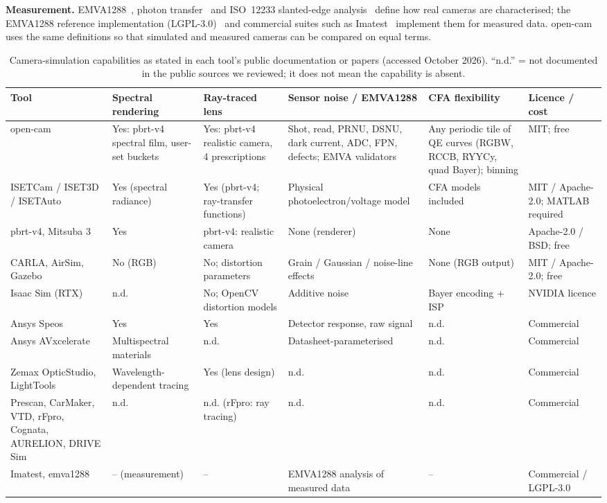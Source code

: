 \documentclass[letterpaper,twocolumn,fleqn]{article}
\begin{document}
\textbf{Measurement.} EMVA1288~\cite{emva1288std,borek2023emva}, photon transfer~\cite{janesick2007photon} and ISO~12233 slanted-edge analysis~\cite{iso12233,williams2003lowfreq} define how real cameras are characterised; the EMVA1288 reference implementation (LGPL-3.0)~\cite{emva1288py} and commercial suites such as Imatest~\cite{imatest} implement them for measured data. open-cam uses the same definitions so that simulated and measured cameras can be compared on equal terms.

\begin{table}[t]
\caption{Camera-simulation capabilities as stated in each tool's public documentation or papers (accessed October 2026). ``n.d.'' = not documented in the public sources we reviewed; it does not mean the capability is absent.}
\label{tab:compare}
\vspace{14pt}
\centering\small
\begin{tabular}{@{}p{2.5cm}p{2.5cm}p{2.4cm}p{3.0cm}p{2.9cm}p{2.3cm}@{}}
\toprule
Tool & Spectral rendering & Ray-traced lens & Sensor noise / EMVA1288 & CFA flexibility & Licence / cost \\
\midrule
open-cam & Yes: pbrt-v4 spectral film, user-set buckets & Yes: pbrt-v4 realistic camera, 4 prescriptions & Shot, read, PRNU, DSNU, dark current, ADC, FPN, defects; EMVA validators & Any periodic tile of QE curves (RGBW, RCCB, RYYCy, quad Bayer); binning & MIT; free \\
ISETCam / ISET3D / ISETAuto & Yes (spectral radiance) & Yes (pbrt-v4; ray-transfer functions) & Physical photoelectron/voltage model & CFA models included~\cite{isetcam} & MIT / Apache-2.0; MATLAB required \\
pbrt-v4, Mitsuba 3 & Yes & pbrt-v4: realistic camera & None (renderer) & None & Apache-2.0 / BSD; free \\
CARLA, AirSim, Gazebo & No (RGB) & No; distortion parameters & Grain / Gaussian / noise-line effects & None (RGB output) & MIT / Apache-2.0; free \\
Isaac Sim (RTX) & n.d. & No; OpenCV distortion models & Additive noise & Bayer encoding + ISP & NVIDIA licence \\
Ansys Speos & Yes & Yes & Detector response, raw signal & n.d. & Commercial \\
Ansys AVxcelerate & Multispectral materials & n.d. & Datasheet-parameterised & n.d. & Commercial \\
Zemax OpticStudio, LightTools & Wavelength-dependent tracing & Yes (lens design) & n.d. & n.d. & Commercial \\
Prescan, CarMaker, VTD, rFpro, Cognata, AURELION, DRIVE Sim & n.d. & n.d. (rFpro: ray tracing) & n.d. & n.d. & Commercial \\
Imatest, emva1288 & -- (measurement) & -- & EMVA1288 analysis of measured data & -- & Commercial / LGPL-3.0 \\
\bottomrule
\end{tabular}
\end{table}
\end{document}
